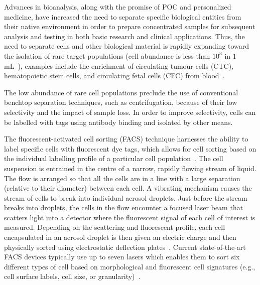 Advances in bioanalysis, along with the promise of POC and personalized medicine, have increased the need to separate specific biological entities from their native environment in order to prepare concentrated samples for subsequent analysis and testing in both basic research and clinical applications. Thus, the need to separate cells and other biological material is rapidly expanding toward the isolation of rare target populations (cell abundance is less than $10^{3}$ in $1$ mL~\cite{Dharmasiri2010}), examples include the enrichment of circulating tumour cells (CTC), hematopoietic stem cells, and circulating fetal cells (CFC) from blood~\cite{Armstrong2011,Chen2014}.

The low abundance of rare cell populations preclude the use of conventional benchtop separation techniques, such as centrifugation, because of their low selectivity and the impact of sample loss. In order to improve selectivity, cells can be labelled with tags using antibody binding and isolated by other means. 

The fluorescent-activated cell sorting (FACS) technique harnesses the ability to label specific cells with fluorescent dye tags, which allows for cell sorting based on the individual labelling profile of a particular cell population~\cite{Bonner1972}. The cell suspension is entrained in the centre of a narrow, rapidly flowing stream of liquid. The flow is arranged so that all the cells are in a line with a large separation (relative to their diameter) between each cell. A vibrating mechanism causes the stream of cells to break into individual aerosol droplets. Just before the stream breaks into droplets, the cells in the flow encounter a focused laser beam that scatters light into a detector where the fluorescent signal of each cell of interest is measured. Depending on the scattering and fluorescent profile, each cell encapsulated in an aerosol droplet is then given an electric charge and then physically sorted using electrostatic deflection plates~\cite{Bonner1972}. Current state-of-the-art FACS devices typically use up to seven lasers which enables them to sort six different types of cell based on morphological and fluorescent cell signatures (e.g., cell surface labels, cell size, or granularity)~\cite{Piyasena2014,Gossett2010}.

